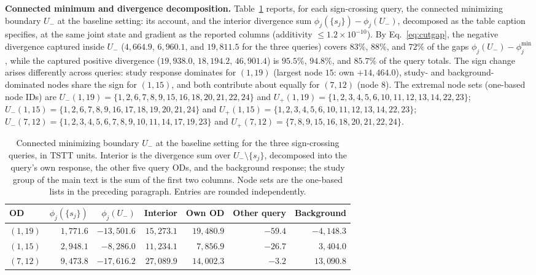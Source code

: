\textbf{Connected minimum and divergence decomposition.}
Table~\ref{tab:negmech} reports, for each sign-crossing query, the
connected minimizing boundary $U_-$ at the baseline setting: its
account, and the interior divergence sum
$\phi_j(\{s_j\})-\phi_j(U_-)$, decomposed as the table caption
specifies, at the same joint state and gradient as the reported
columns (additivity $\le1.2\times10^{-10}$).
By Eq.~\eqref{eq:cutgap}, the negative divergence captured inside
$U_-$ ($4{,}664.9$, $6{,}960.1$, and $19{,}811.5$ for the three
queries) covers $83\%$, $88\%$, and $72\%$ of the gaps
$\phi_j(U_-)-\phi_j^{\min}$, while the captured positive divergence
($19{,}938.0$, $18{,}194.2$, $46{,}901.4$) is $95.5\%$, $94.8\%$,
and $85.7\%$ of the query totals. The sign change arises
differently across queries: study response
dominates for $(1,19)$ (largest node $15$: own $+14{,}464.0$),
study- and background-dominated nodes share the sign for $(1,15)$,
and both contribute about equally for $(7,12)$ (node $8$).
The extremal node sets (one-based node IDs) are
$U_-(1,19)=\{1,2,6,7,8,9,15,16,18,20,21,22,24\}$ and
$U_+(1,19)=\{1,2,3,4,5,6,10,11,12,13,14,22,23\}$;
$U_-(1,15)=\{1,2,6,7,8,9,16,17,18,19,20,21,24\}$ and
$U_+(1,15)=\{1,2,3,4,5,6,10,11,12,13,14,22,23\}$;
$U_-(7,12)=\{1,2,3,4,5,6,7,8,9,10,11,14,17,19,23\}$ and
$U_+(7,12)=\{7,8,9,15,16,18,20,21,22,24\}$.

\begin{table}[pos=tbh]
\caption{Connected minimizing boundary $U_-$ at the baseline setting
for the three sign-crossing queries, in TSTT units. Interior is the
divergence sum over $U_-\setminus\{s_j\}$, decomposed into the query's
own response, the other five query ODs, and the background response;
the study group of the main text is the sum of the first two columns.
Node sets are the one-based lists in the preceding paragraph. Entries
are rounded independently.}
\label{tab:negmech}
\small
\begin{tabular*}{\tblwidth}{@{\extracolsep{\fill}}lrrrrrr}
\toprule
OD & $\phi_j(\{s_j\})$ & $\phi_j(U_-)$ & Interior & Own OD & Other query & Background\\
\midrule
$(1,19)$ & $1{,}771.6$ & $-13{,}501.6$ & $15{,}273.1$ & $19{,}480.9$ & $-59.4$ & $-4{,}148.3$ \\
$(1,15)$ & $2{,}948.1$ & $-8{,}286.0$ & $11{,}234.1$ & $7{,}856.9$ & $-26.7$ & $3{,}404.0$ \\
$(7,12)$ & $9{,}473.8$ & $-17{,}616.2$ & $27{,}089.9$ & $14{,}002.3$ & $-3.2$ & $13{,}090.8$ \\
\bottomrule
\end{tabular*}
\end{table}

